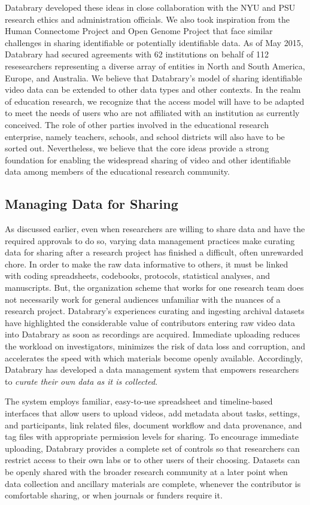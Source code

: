 \documentclass[letterpaper,man,apacite]{apa6}
\begin{document}
Databrary developed these ideas in close collaboration with the NYU and PSU research ethics and administration officials.
We also took inspiration from the Human Connectome Project and Open Genome Project that face similar challenges in sharing identifiable or potentially identifiable data.
As of May 2015, Databrary had secured agreements with 62 institutions on behalf of 112 resesearchers representing a diverse array of entities in North and South America, Europe, and Australia.
We believe that Databrary's model of sharing identifiable video data can be extended to other data types and other contexts.
In the realm of education research, we recognize that the access model will have to be adapted to meet the needs of users who are not affiliated with an institution as currently conceived.
The role of other parties involved in the educational research enterprise, namely teachers, schools, and school districts will also have to be sorted out.
Nevertheless, we believe that the core ideas provide a strong foundation for enabling the widespread sharing of video and other identifiable data among members of the educational research community.

\subsection{Managing Data for Sharing}

As discussed earlier, even when researchers are willing to share data and have the required approvals to do so, varying data management practices make curating data for sharing after a research project has finished a difficult, often unrewarded chore.
In order to make the raw data informative to others, it must be linked with coding spreadsheets, codebooks, protocols, statistical analyses, and manuscripts.
But, the organization scheme that works for one research team does not necessarily work for general audiences unfamiliar with the nuances of a research project.
Databrary's experiences curating and ingesting archival datasets have highlighted the considerable value of contributors entering raw video data into Databrary as soon as recordings are acquired. 
Immediate uploading reduces the workload on investigators, minimizes the risk of data loss and corruption, and accelerates the speed with which materials become openly available. 
Accordingly, Databrary has developed a data management system that empowers researchers to \emph{curate their own data as it is collected}.

The system employs familiar, easy-to-use spreadsheet and timeline-based interfaces that allow users to upload videos, add metadata about tasks, settings, and participants, link related files, document workflow and data provenance, and tag files with appropriate permission levels for sharing. 
To encourage immediate uploading, Databrary provides a complete set of controls so that researchers can restrict
access to their own labs or to other users of their choosing. 
Datasets can be openly shared with the broader research community at a later point when data collection and ancillary materials are complete, whenever the contributor is comfortable sharing, or when journals or funders require it. 
\end{document}
